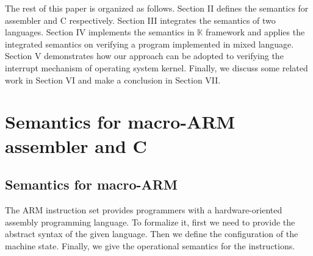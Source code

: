 \documentclass[conference]{IEEEtran}
\begin{document}
 The rest of this paper is organized as follows. Section II defines the semantics for assembler and C respectively. Section III integrates the semantics of two languages. Section IV implements the semantics in $\mathbb{K}$ framework and applies the integrated semantics on verifying a program implemented in mixed language. Section V demonstrates how our approach can be adopted to verifying the interrupt mechanism of operating system kernel. Finally, we discuss some related
 work in Section VI and make a conclusion in Section VII.
 
\section{Semantics for macro-ARM assembler and C}
\subsection{Semantics for macro-ARM}
The ARM instruction set provides programmers with a hardware-oriented assembly programming language. To formalize it, first we need to provide the abstract syntax of the given language. Then we define the configuration of the machine state. Finally, we give the operational semantics for the instructions.
%
\end{document}
